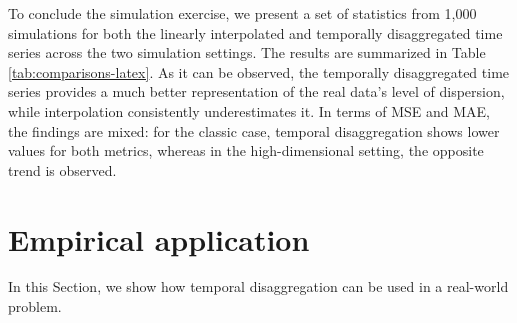 To conclude the simulation exercise, we present a set of statistics from 1,000 simulations for both the linearly interpolated and temporally disaggregated time series across the two simulation settings. The results are summarized in Table \ref{tab:comparisons-latex}. As it can be observed, the temporally disaggregated time series provides a much better representation of the real data's level of dispersion, while interpolation consistently underestimates it. In terms of MSE and MAE, the findings are mixed: for the classic case, temporal disaggregation shows lower values for both metrics, whereas in the high-dimensional setting, the opposite trend is observed.

\begin{table}[!h]
\centering
\caption{\label{tab:comparisons-latex}Mean and standard deviation (in parentheses) of key statistical measures for the high-frequency simulated observations, temporal disaggregated observations, and interpolated observations across 1000 Monte Carlo simulations. MAE and MSE are computed with respect to the high-frequency simulated observations.}
\centering
{}
\end{table}

\hypertarget{Empirical-application}{%
\section{Empirical application}\label{Empirical-application}}

In this Section, we show how temporal disaggregation can be used in a real-world problem.

